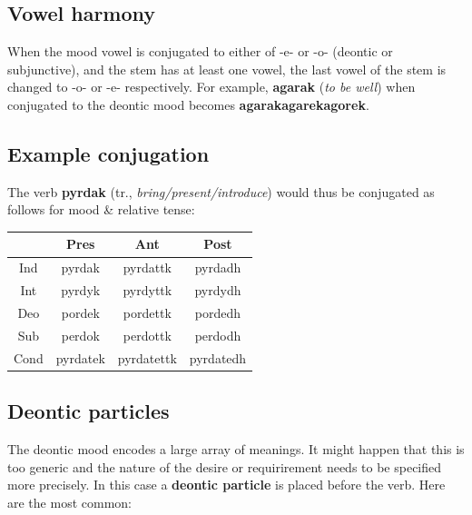 \documentclass[10pt,oneside]{memoir}
\begin{document}
\begin{multicols}{2}
	\subsection{Vowel harmony}

	When the mood vowel is conjugated to either of -e- or -o- (deontic or subjunctive), and the stem has at least one vowel, the last vowel of the stem is changed to -o- or -e- respectively. For example, \textbf{agarak} (\emph{to be well}) when conjugated to the deontic mood becomes \textbf{agarak}\textrightarrow\textbf{agarek}\textrightarrow\textbf{agorek}.


	\subsection{Example conjugation}

	\vspace{10pt}

	The verb \textbf{pyrdak} (tr., \emph{bring/present/introduce}) would thus be conjugated as follows for mood \& relative tense:

	\begin{tabular}{c | c c c}
			& Pres & Ant & Post \\
			\hline
		Ind	& pyrdak & pyrdattk & pyrdadh\\
		Int	& pyrdyk & pyrdyttk & pyrdydh\\
		Deo	& pordek & pordettk & pordedh\\
		Sub	& perdok & perdottk & perdodh\\
		Cond	& pyrdatek & pyrdatettk & pyrdatedh
	\end{tabular}

    \subsection{Deontic particles}

    The deontic mood encodes a large array of meanings. It might happen that this is too generic and the nature of the desire or requirirement needs to be specified more precisely. In this case a \textbf{deontic particle} is placed before the verb. Here are the most common:


\end{multicols}
\end{document}
